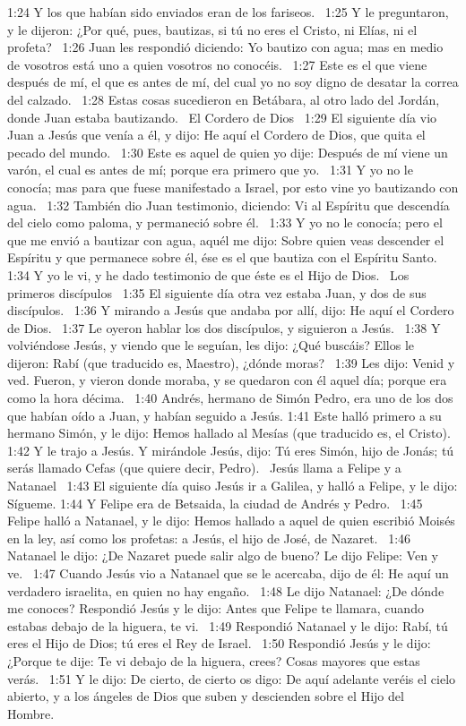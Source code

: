 1:24 Y los que habían sido enviados eran de los fariseos.  
1:25 Y le preguntaron, y le dijeron: ¿Por qué, pues, bautizas, si tú no eres el Cristo, ni Elías, ni el profeta?  
1:26 Juan les respondió diciendo: Yo bautizo con agua; mas en medio de vosotros está uno a quien vosotros no conocéis.  
1:27 Este es el que viene después de mí, el que es antes de mí, del cual yo no soy digno de desatar la correa del calzado.  
1:28 Estas cosas sucedieron en Betábara, al otro lado del Jordán, donde Juan estaba bautizando.  
El Cordero de Dios  
1:29 El siguiente día vio Juan a Jesús que venía a él, y dijo: He aquí el Cordero de Dios, que quita el pecado del mundo.  
1:30 Este es aquel de quien yo dije: Después de mí viene un varón, el cual es antes de mí; porque era primero que yo.  
1:31 Y yo no le conocía; mas para que fuese manifestado a Israel, por esto vine yo bautizando con agua.  
1:32 También dio Juan testimonio, diciendo: Vi al Espíritu que descendía del cielo como paloma, y permaneció sobre él.  
1:33 Y yo no le conocía; pero el que me envió a bautizar con agua, aquél me dijo: Sobre quien veas descender el Espíritu y que permanece sobre él, ése es el que bautiza con el Espíritu Santo.  
1:34 Y yo le vi, y he dado testimonio de que éste es el Hijo de Dios.  
Los primeros discípulos  
1:35 El siguiente día otra vez estaba Juan, y dos de sus discípulos.  
1:36 Y mirando a Jesús que andaba por allí, dijo: He aquí el Cordero de Dios.  
1:37 Le oyeron hablar los dos discípulos, y siguieron a Jesús.  
1:38 Y volviéndose Jesús, y viendo que le seguían, les dijo: ¿Qué buscáis? Ellos le dijeron: Rabí (que traducido es, Maestro), ¿dónde moras?  
1:39 Les dijo: Venid y ved. Fueron, y vieron donde moraba, y se quedaron con él aquel día; porque era como la hora décima.  
1:40 Andrés, hermano de Simón Pedro, era uno de los dos que habían oído a Juan, y habían seguido a Jesús. 
1:41 Este halló primero a su hermano Simón, y le dijo: Hemos hallado al Mesías (que traducido es, el Cristo).  
1:42 Y le trajo a Jesús. Y mirándole Jesús, dijo: Tú eres Simón, hijo de Jonás; tú serás llamado Cefas (que quiere decir, Pedro).  
Jesús llama a Felipe y a Natanael  
1:43 El siguiente día quiso Jesús ir a Galilea, y halló a Felipe, y le dijo: Sígueme. 
1:44 Y Felipe era de Betsaida, la ciudad de Andrés y Pedro.  
1:45 Felipe halló a Natanael, y le dijo: Hemos hallado a aquel de quien escribió Moisés en la ley, así como los profetas: a Jesús, el hijo de José, de Nazaret.  
1:46 Natanael le dijo: ¿De Nazaret puede salir algo de bueno? Le dijo Felipe: Ven y ve.  
1:47 Cuando Jesús vio a Natanael que se le acercaba, dijo de él: He aquí un verdadero israelita, en quien no hay engaño.  
1:48 Le dijo Natanael: ¿De dónde me conoces? Respondió Jesús y le dijo: Antes que Felipe te llamara, cuando estabas debajo de la higuera, te vi.  
1:49 Respondió Natanael y le dijo: Rabí, tú eres el Hijo de Dios; tú eres el Rey de Israel.  
1:50 Respondió Jesús y le dijo: ¿Porque te dije: Te vi debajo de la higuera, crees? Cosas mayores que estas verás.  
1:51 Y le dijo: De cierto, de cierto os digo: De aquí adelante veréis el cielo abierto, y a los ángeles de Dios que suben y descienden sobre el Hijo del Hombre.  
